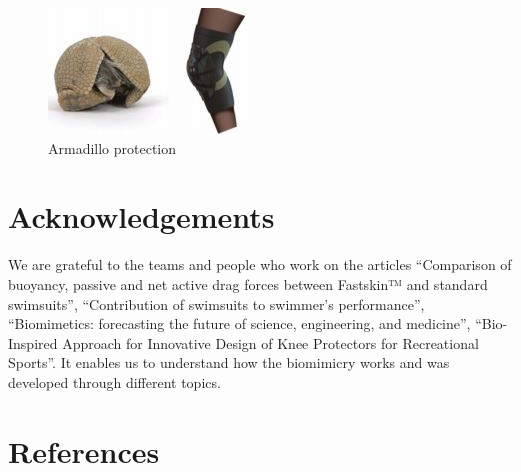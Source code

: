 \documentclass[twoside,twocolumn]{article}                          %
\begin{document}
\begin{figure}[!h]
  \begin{center}
    \includegraphics[scale=1]{arma.JPG}
  \end{center}
  \caption{Armadillo protection}
  \end{figure}
\section{Acknowledgements}
We are grateful to the teams and people who work on the articles “Comparison of buoyancy, passive and net active drag forces between Fastskin™\cite{Fastskin} and standard swimsuits”, “Contribution of swimsuits to swimmer’s performance”\cite{Swimsuits}, “Biomimetics: forecasting the future of science, engineering, and medicine”, “Bio-Inspired Approach for Innovative Design of Knee Protectors for Recreational Sports”. It enables us to understand how the biomimicry works and was developed through different topics. 






\section{References}


\end{document}
